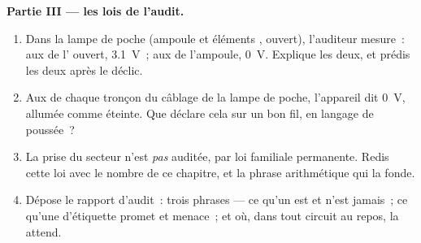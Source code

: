 \begin{problem}
\medskip\noindent\textbf{Partie III --- les lois de l'audit.}
\begin{enumerate}[resume]
  \item Dans la lampe de poche (ampoule et éléments ,
         ouvert), l'auditeur mesure~: aux  de
        l' ouvert, \qty{3.1}{V}~; aux  de
        l'ampoule, \qty{0}{V}. Explique les deux, et prédis les
        deux après le déclic.
  \item Aux  de chaque tronçon du câblage de la lampe de
        poche, l'appareil dit \qty{0}{V}, allumée comme éteinte. Que
        déclare cela sur un bon fil, en langage de poussée~?
  \item La prise du secteur n'est \emph{pas} auditée, par loi
        familiale permanente. Redis cette loi avec le nombre de ce
        chapitre, et la phrase arithmétique qui la fonde.
  \item Dépose le rapport d'audit~: trois phrases --- ce qu'un
         est et n'est jamais~; ce qu'une 
        d'étiquette promet et menace~; et où, dans tout circuit au
        repos, la  attend.
\end{enumerate}
\end{problem}
